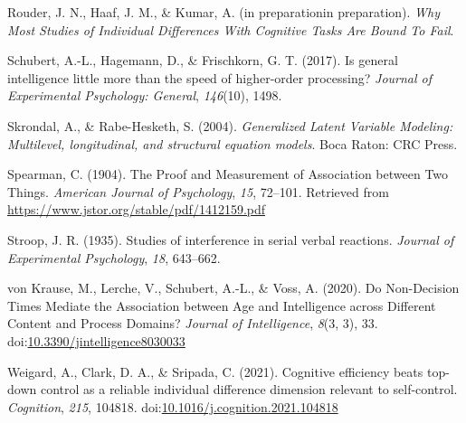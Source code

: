 \documentclass[
  ,man]{apa6}
\newlength{\cslhangindent}
\newlength{\cslentryspacingunit} %
\newenvironment{CSLReferences}[2] %
 {%
  \setlength{\parindent}{0pt}
  \ifodd #1
  \let\oldpar\par
  \def\par{\hangindent=\cslhangindent\oldpar}
  \fi
  \setlength{\parskip}{#2\cslentryspacingunit}
 }%
 {}
\begin{document}
\begin{CSLReferences}{1}{0}
\leavevmode{}%
Rouder, J. N., Haaf, J. M., \& Kumar, A. (in preparationin preparation). \emph{Why {Most Studies} of {Individual Differences With Cognitive Tasks Are Bound To Fail}}.

\leavevmode{}%
Schubert, A.-L., Hagemann, D., \& Frischkorn, G. T. (2017). Is general intelligence little more than the speed of higher-order processing? \emph{Journal of Experimental Psychology: General}, \emph{146}(10), 1498.

\leavevmode{}%
Skrondal, A., \& Rabe-Hesketh, S. (2004). \emph{Generalized {Latent Variable Modeling}: Multilevel, longitudinal, and structural equation models}. {Boca Raton}: {CRC Press}.

\leavevmode{}%
Spearman, C. (1904). The {Proof} and {Measurement} of {Association} between {Two Things}. \emph{American Journal of Psychology}, \emph{15}, 72--101. Retrieved from \url{https://www.jstor.org/stable/pdf/1412159.pdf}

\leavevmode{}%
Stroop, J. R. (1935). Studies of interference in serial verbal reactions. \emph{Journal of Experimental Psychology}, \emph{18}, 643--662.

\leavevmode{}%
von Krause, M., Lerche, V., Schubert, A.-L., \& Voss, A. (2020). Do {Non-Decision Times Mediate} the {Association} between {Age} and {Intelligence} across {Different Content} and {Process Domains}? \emph{Journal of Intelligence}, \emph{8}(3, 3), 33. doi:\href{https://doi.org/10.3390/jintelligence8030033}{10.3390/jintelligence8030033}

\leavevmode{}%
Weigard, A., Clark, D. A., \& Sripada, C. (2021). Cognitive efficiency beats top-down control as a reliable individual difference dimension relevant to self-control. \emph{Cognition}, \emph{215}, 104818. doi:\href{https://doi.org/10.1016/j.cognition.2021.104818}{10.1016/j.cognition.2021.104818}

\end{CSLReferences}
\end{document}
